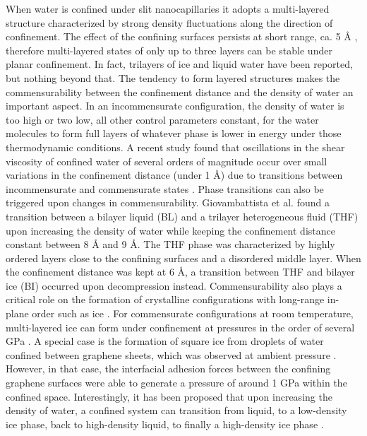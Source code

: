 \documentclass[journal=acsnano,manuscript=article]{achemso}
\begin{document}
	When water is confined under slit nanocapillaries it adopts a multi-layered structure characterized by strong density fluctuations along the direction of confinement. The effect of the confining surfaces persists at short range, ca. 5 \r A \cite{Cicero2008,Chialvo2016}, therefore multi-layered states of only up to three layers can be stable under planar confinement. In fact, trilayers of ice \cite{Algara-Siller2015,Satarifard2017,Zhu2015} and liquid water \cite{Giovambattista2009,Qiu2015} have been reported, but nothing beyond that. The tendency to form layered structures makes the commensurability between the confinement distance and the density of water an important aspect. In an incommensurate configuration, the density of water is too high or two low, all other control parameters constant, for the water molecules to form full layers of whatever phase is lower in energy under those thermodynamic conditions. A recent study found that oscillations in the shear viscosity of confined water of several orders of magnitude occur over small variations in the confinement distance (under 1 \r A) due to transitions between incommensurate and commensurate states \cite{Neek-Amal2016}. Phase transitions can also be triggered upon changes in commensurability. Giovambattista et al. found a transition between a bilayer liquid (BL) and a trilayer heterogeneous fluid (THF) upon increasing the density of water while keeping the confinement distance constant between 8 \r A and 9 \r A. The THF phase was characterized by highly ordered layers close to the confining surfaces and a disordered middle layer. When the confinement distance was kept at 6 \r A, a transition between THF and bilayer ice (BI) occurred upon decompression instead. Commensurability also plays a critical role on the formation of crystalline configurations with long-range in-plane order such as ice \cite{Satarifard2017,Chen2017,Corsetti2016}. For commensurate configurations at room temperature, multi-layered ice can form under confinement at pressures in the order of several GPa \cite{Zhu2015}. A special case is the formation of square ice from droplets of water confined between graphene sheets, which was observed at ambient pressure \cite{Algara-Siller2015}. However, in that case, the interfacial adhesion forces between the confining graphene surfaces were able to generate a pressure of around 1 GPa within the confined space. Interestingly, it has been proposed that upon increasing the density of water, a confined system can transition from liquid, to a low-density ice phase, back to high-density liquid, to finally a high-density ice phase \cite{Han2010}.
	
\end{document}
